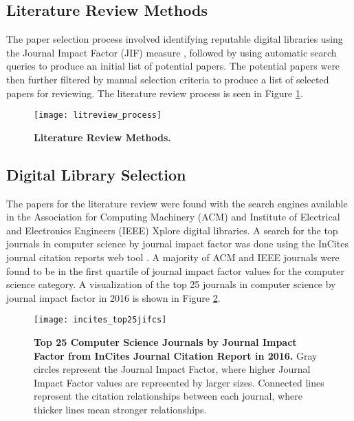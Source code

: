 



\begin{appendices}

\section{Literature Review Methods}  \label{appendix:literature-review-methods}

The paper selection process involved identifying reputable digital libraries using the Journal Impact Factor (JIF) measure \citep{Garfield:2006b}, followed by using automatic search queries to produce an initial list of potential papers. The potential papers were then further filtered by manual selection criteria to produce a list of selected papers for reviewing. The literature review process is seen in Figure \ref{figure:litreview_process}.

\begin{figure}[!htb]
	\centering
	\texttt{[image: litreview\_process]}
	\caption{\textbf{Literature Review Methods.}}
	\label{figure:litreview_process}
\end{figure}

\subsection{Digital Library Selection} \label{appendix:digital-library-selection}

The papers for the literature review were found with the search engines available in the Association for Computing Machinery (ACM) \citep{ACM:2017} and Institute of Electrical and Electronics Engineers (IEEE) Xplore \citep{IEEE:2017} digital libraries. A search for the top journals in computer science by journal impact factor \citep{Garfield:2006b} was done using the InCites journal citation reports web tool \citep{Clarivate:2017a}. A majority of ACM and IEEE journals were found to be in the first quartile of journal impact factor values for the computer science category. A visualization of the top 25 journals in computer science by journal impact factor in 2016 is shown in Figure \ref{figure:incites_top25jifcs}.

\begin{figure}[!htb]
	\centering
	\texttt{[image: incites\_top25jifcs]}
	\caption{\textbf{Top 25 Computer Science Journals by Journal Impact Factor from InCites Journal Citation Report in 2016.} Gray circles represent the Journal Impact Factor, where higher Journal Impact Factor values are represented by larger sizes. Connected lines represent the citation relationships between each journal, where thicker lines mean stronger relationships.}
	\label{figure:incites_top25jifcs}
\end{figure}


\end{appendices}
